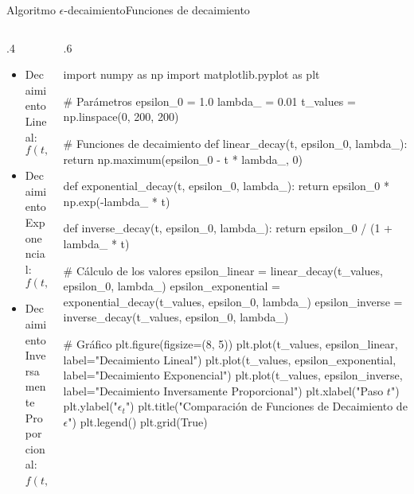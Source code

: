 \documentclass[10pt, envcountsect, handout, aspectratio=1610, hyperref={hypertexnames=true}]{beamer}
\begin{document}

\begin{frame}[fragile]{Algoritmo $\epsilon$-decaimiento}{Funciones de decaimiento}

\begin{columns}

\begin{column}{.4\textwidth}


\begin{itemize}
	
\item Decaimiento Lineal:
   \[
   f(t, \epsilon_0, \lambda) = \epsilon_0 - t \cdot \lambda
   \]

\item Decaimiento Exponencial:
   \[
   f(t, \epsilon_0, \lambda) = \epsilon_0 \cdot e^{-\lambda t}
   \]

\item Decaimiento Inversamente Proporcional:
   \[
   f(t, \epsilon_0, \lambda) = \frac{\epsilon_0}{1 + \lambda t}
   \]
\end{itemize}

\end{column}

\begin{column}{.6\textwidth}
\begin{pycode}
import numpy as np
import matplotlib.pyplot as plt

# Parámetros
epsilon_0 = 1.0
lambda_ = 0.01
t_values = np.linspace(0, 200, 200)

# Funciones de decaimiento
def linear_decay(t, epsilon_0, lambda_):
    return np.maximum(epsilon_0 - t * lambda_, 0)

def exponential_decay(t, epsilon_0, lambda_):
    return epsilon_0 * np.exp(-lambda_ * t)

def inverse_decay(t, epsilon_0, lambda_):
    return epsilon_0 / (1 + lambda_ * t)

# Cálculo de los valores
epsilon_linear = linear_decay(t_values, epsilon_0, lambda_)
epsilon_exponential = exponential_decay(t_values, epsilon_0, lambda_)
epsilon_inverse = inverse_decay(t_values, epsilon_0, lambda_)

# Gráfico
plt.figure(figsize=(8, 5))
plt.plot(t_values, epsilon_linear, label="Decaimiento Lineal")
plt.plot(t_values, epsilon_exponential, label="Decaimiento Exponencial")
plt.plot(t_values, epsilon_inverse, label="Decaimiento Inversamente Proporcional")
plt.xlabel("Paso $t$")
plt.ylabel("$\epsilon_t$")
plt.title("Comparación de Funciones de Decaimiento de $\epsilon$")
plt.legend()
plt.grid(True)


\end{pycode}
\end{column}
\end{columns}
\end{frame}
\end{document}
